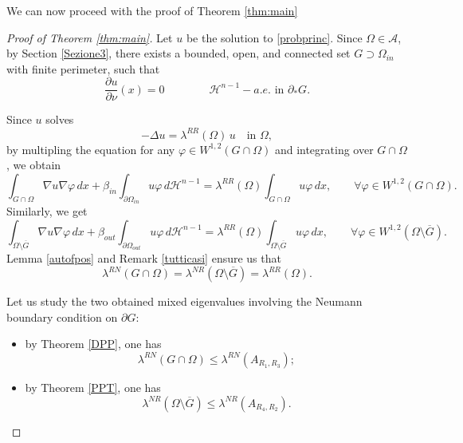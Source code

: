 \documentclass[oneside,a4paper,11pt,notitlepage]{article}
\newcommand{\Simm}{\mathcal A}
\theoremstyle{plain}
\numberwithin{teor}{section}
\numberwithin{equation}{section}
\theoremstyle{definition}
\theoremstyle{plain}
\theoremstyle{plain}
\theoremstyle{plain}
\theoremstyle{plain}
\theoremstyle{definition}
\theoremstyle{definition}
\theoremstyle{plain}
\begin{document}
We can now proceed with the proof of Theorem \ref{thm:main}

\begin{proof}[Proof of Theorem \ref{thm:main}]
    Let $u$ be the solution to \eqref{probprinc}. Since $\Omega \in \Simm$, by Section \ref{Sezione3}, there exists a bounded, open, and  connected set $G \supset \Omega_{in}$ with finite perimeter, such that 
    $$
    \frac{\partial u}{\partial \nu}(x)= 0 \qquad\qquad \mathcal{H}^{n-1}-a.e. \text{ in } \partial_\ast G.$$

Since $u$ solves \[
- \Delta u = \lambda^{RR}(\Omega)\, u \quad \text{in } \Omega,
\]by multipling the equation for any $\varphi \in W^{1,2}(G \cap \Omega)$ and integrating over $G \cap \Omega$, we obtain  
\begin{equation}
\label{gintom}
    \int _{G \cap \Omega} \nabla u \nabla \varphi \, dx+\beta_{in} \int_{\partial\Omega_{in}} u \varphi \, d \mathcal{H}^{n-1} = \lambda^{RR}(\Omega)\int_{G \cap\Omega} u \varphi \, dx, \qquad \forall \varphi \in W^{1,2}(G \cap\Omega).
    \end{equation}
Similarly, we get 
\begin{equation}
\label{gmenom}
    \int _{\Omega \setminus \overline G} \nabla u \nabla \varphi \, dx+\beta_{out} \int_{\partial\Omega_{out}} u \varphi \, d \mathcal{H}^{n-1} = \lambda^{RR}(\Omega)\int_{\Omega \setminus \overline G} u \varphi \, dx, \qquad \forall \varphi \in W^{1,2}(\Omega \setminus \overline G).
    \end{equation} 
Lemma \ref{autofpos} and Remark \ref{tutticasi} ensure us that 
$$
\lambda^{RN}(G\cap \Omega)=\lambda^{NR}(\Omega\setminus \overline{G})=\lambda^{RR}(\Omega).$$

Let us study the two obtained mixed eigenvalues involving the Neumann boundary condition on $\partial G$:
\begin{itemize}
    \item by Theorem \ref{DPP}, one has
    \begin{equation}
    \label{dpp}
        \lambda^{RN}(G\cap \Omega)\leq \lambda^{RN}(A_{R_1,R_3});
    \end{equation}

    \item by Theorem \ref{PPT}, one has
    \begin{equation}
        \label{ppt}
        \lambda^{NR}(\Omega\setminus \overline{G})\leq \lambda^{NR}(A_{R_4,R_2}).
    \end{equation}
\end{itemize}


\end{proof}
\end{document}

